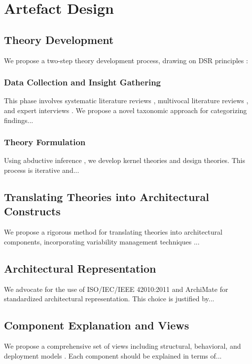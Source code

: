\documentclass[12pt,a4paper]{article}
\begin{document}
\section{Artefact Design}
\label{sec:design}

\subsection{Theory Development}
\label{subsec:theory}
We propose a two-step theory development process, drawing on DSR principles \citep{Gregor2013}:

\subsubsection{Data Collection and Insight Gathering}
This phase involves systematic literature reviews \citep{Kitchenham2007}, multivocal literature reviews \citep{Garousi2019}, and expert interviews \citep{Bogner2009}. We propose a novel taxonomic approach for categorizing findings...

\subsubsection{Theory Formulation}
Using abductive inference \citep{Dubois2014}, we develop kernel theories and design theories. This process is iterative and...

\subsection{Translating Theories into Architectural Constructs}
\label{subsec:translation}
We propose a rigorous method for translating theories into architectural components, incorporating variability management techniques \citep{Galster2014}...

\subsection{Architectural Representation}
\label{subsec:representation}
We advocate for the use of ISO/IEC/IEEE 42010:2011 \citep{ISO42010} and ArchiMate \citep{Lankhorst2017} for standardized architectural representation. This choice is justified by...

\subsection{Component Explanation and Views}
\label{subsec:views}
We propose a comprehensive set of views including structural, behavioral, and deployment models \citep{Kruchten1995}. Each component should be explained in terms of...
\end{document}
